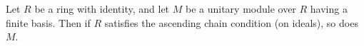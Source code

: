 Let $R$ be a ring with identity, and let $M$ be a unitary module over $R$ having a finite basis. Then if $R$ satisfies the ascending chain condition (on ideals), so does $M$.
